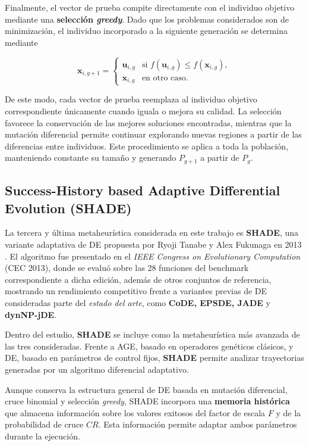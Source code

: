 Finalmente, el vector de prueba compite directamente con el individuo objetivo mediante una \textbf{selección \textit{greedy}}. Dado que los problemas considerados son de minimización, el individuo incorporado a la siguiente generación se determina mediante

\[
    \mathbf{x}_{i,g+1}
    =
    \begin{cases}
        \mathbf{u}_{i,g}
         & \text{si } f(\mathbf{u}_{i,g})
        \leq f(\mathbf{x}_{i,g}),         \\
        \mathbf{x}_{i,g}
         & \text{en otro caso}.
    \end{cases}
\]

De este modo, cada vector de prueba reemplaza al individuo objetivo correspondiente únicamente cuando iguala o mejora su calidad. La selección favorece la conservación de las mejores soluciones encontradas, mientras que la mutación diferencial permite continuar explorando nuevas regiones a partir de las diferencias entre individuos. Este procedimiento se aplica a toda la población, manteniendo constante su tamaño y generando \(P_{g+1}\) a partir de \(P_g\).

\subsection{Success-History based Adaptive Differential Evolution (SHADE)}

La tercera y última metaheurística considerada en este trabajo es \textbf{SHADE}, una variante adaptativa de DE propuesta por Ryoji Tanabe y Alex Fukunaga en 2013 \cite{tanabe2013shade}. El algoritmo fue presentado en el \textit{IEEE Congress on Evolutionary Computation} (CEC 2013), donde se evaluó sobre las 28 funciones del benchmark correspondiente a dicha edición, además de otros conjuntos de referencia, mostrando un rendimiento competitivo frente a variantes previas de DE consideradas parte del \textit{estado del arte}, como \textbf{CoDE, EPSDE, JADE} y \textbf{dynNP-jDE}.

Dentro del estudio, \textbf{SHADE} se incluye como la metaheurística más avanzada de las tres consideradas. Frente a AGE, basado en operadores genéticos clásicos, y DE, basado en parámetros de control fijos, \textbf{SHADE} permite analizar trayectorias generadas por un algoritmo diferencial adaptativo.

Aunque conserva la estructura general de DE basada en mutación diferencial, cruce binomial y selección \textit{greedy}, SHADE incorpora una \textbf{memoria histórica} que almacena información sobre los valores exitosos del factor de escala \(F\) y de la probabilidad de cruce \(CR\). Esta información permite adaptar ambos parámetros durante la ejecución.

